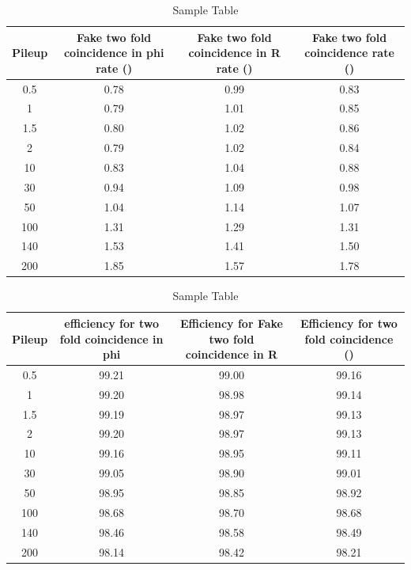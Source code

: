 \begin{table}[htbp]
  \centering
  \caption{Sample Table}
  \label{tab:sample}
  \begin{tabular}{cccc}
    \textbf{Pileup} & \textbf{Fake two fold coincidence in phi rate ()} & \textbf{Fake two fold coincidence in R rate ()} & \textbf{Fake two fold coincidence rate ()} \\
    \hline
   0.5  &  0.78& 0.99 & 0.83 \\
     1& 0.79 &  1.01 &0.85\\
    1.5 &  0.80& 1.02 & 0.86 \\
     2 & 0.79 & 1.02&  0.84\\
    10 &  0.83&  1.04&  0.88\\
     30&  0.94&  1.09&  0.98\\
     50 &  1.04&  1.14&  1.07\\
    100  & 1.31 & 1.29& 1.31\\
     140  & 1.53 & 1.41& 1.50\\
    200   & 1.85 & 1.57 &1.78\\
  \end{tabular}
\end{table}



\begin{table}[htbp]
  \centering
  \caption{Sample Table}
  \label{tab:sample}
  \begin{tabular}{cccc}
    \textbf{Pileup} & \textbf{efficiency for two fold coincidence in phi} & \textbf{Efficiency for Fake two fold coincidence in R} & \textbf{Efficiency for two fold coincidence ()} \\
    \hline 
     0.5  & 99.21 &99.00  &99.16  \\
     1& 99.20 &98.98  & 99.14 \\
    1.5 & 99.19 & 98.97 & 99.13 \\
     2& 99.20 & 98.97 & 99.13 \\
    10 & 99.16 & 98.95 & 99.11 \\
     30& 99.05 & 98.90 & 99.01 \\
     50 & 98.95 & 98.85 & 98.92 \\
    100& 98.68 & 98.70 & 98.68 \\
     140& 98.46 & 98.58 & 98.49 \\
    200 &98.14  & 98.42 &98.21  \\
  \end{tabular}
\end{table}

